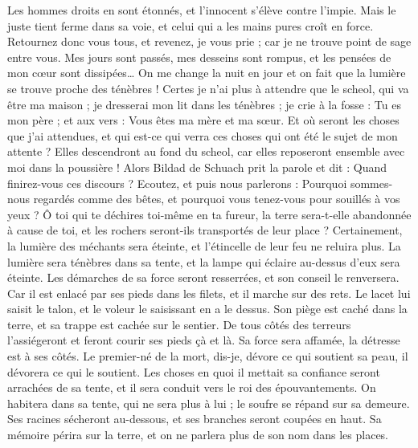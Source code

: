 \begin{multicols}{2}
Les hommes droits en sont étonnés, et l'innocent s'élève contre l'impie.
Mais le juste tient ferme dans sa voie, et celui qui a les mains pures croît en force. 
Retournez donc vous tous, et revenez, je vous prie ; car je ne trouve point de sage entre vous. 
Mes jours sont passés, mes desseins sont rompus, et les pensées de mon cœur sont dissipées… 
On me change la nuit en jour et on fait que la lumière se trouve proche des ténèbres ! 
Certes je n'ai plus à attendre que le scheol, qui va être ma maison ; je dresserai mon lit dans les ténèbres ;
je crie à la fosse : Tu es mon père ; et aux vers : Vous êtes ma mère et ma sœur. 
Et où seront les choses que j'ai attendues, et qui est-ce qui verra ces choses qui ont été le sujet de mon attente ?
Elles descendront au fond du scheol, car elles reposeront ensemble avec moi dans la poussière ! 
\VerseOne{}Alors Bildad de Schuach prit la parole et dit :
Quand finirez-vous ces discours ? Ecoutez, et puis nous parlerons :
Pourquoi sommes-nous regardés comme des bêtes, et pourquoi vous tenez-vous pour souillés à vos yeux ?
Ô toi qui te déchires toi-même en ta fureur, la terre sera-t-elle abandonnée à cause de toi, et les rochers seront-ils transportés de leur place ? 
Certainement, la lumière des méchants sera éteinte, et l'étincelle de leur feu ne reluira plus.
La lumière sera ténèbres dans sa tente, et la lampe qui éclaire au-dessus d'eux sera éteinte.
Les démarches de sa force seront resserrées, et son conseil le renversera.
Car il est enlacé par ses pieds dans les filets, et il marche sur des rets.
Le lacet lui saisit le talon, et le voleur le saisissant en a le dessus. 
Son piège est caché dans la terre, et sa trappe est cachée sur le sentier. 
De tous côtés des terreurs l'assiégeront et feront courir ses pieds çà et là.
Sa force sera affamée, la détresse est à ses côtés.
Le premier-né de la mort, dis-je, dévore ce qui soutient sa peau, il dévorera ce qui le soutient. 
 Les choses en quoi il mettait sa confiance seront arrachées de sa tente, et il sera conduit vers le roi des épouvantements. 
On habitera dans sa tente, qui ne sera plus à lui ; le soufre se répand sur sa demeure. 
Ses racines sécheront au-dessous, et ses branches seront coupées en haut. 
Sa mémoire périra sur la terre, et on ne parlera plus de son nom dans les places.

\end{multicols}
